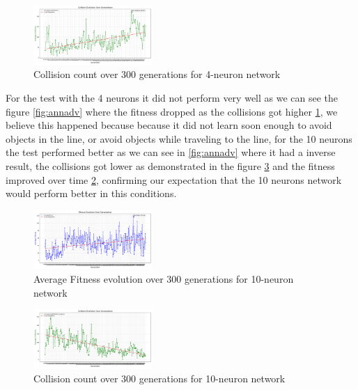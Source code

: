 \documentclass[final,5p,times,twocolumn,authoryear]{elsarticle}
\begin{document}
\begin{figure}[H]
    \centering
    \includegraphics[width=0.4\textwidth]{figures/fitness_ann_adv_plot_4n_collisions.png}
    \caption{Collision count over 300 generations for 4-neuron network}
    \label{fig:annadv2}
\end{figure}

For the test with the 4 neurons it did not perform very well as we can see the figure \ref{fig:annadv} where the fitness dropped as the collisions got higher \ref{fig:annadv2}, we believe this happened because because it did not learn soon enough to avoid objects in the line, or avoid objects while traveling to the line, for the 10 neurons the test performed better as we can see in \ref{fig:annadv} where it had a inverse result, the collisions got lower as demonstrated in the figure \ref{fig:annadv4} and the fitness improved over time \ref{fig:annadv3}, confirming our expectation that the 10 neurons network would perform better in this conditions.

\begin{figure}[H]
    \centering
    \includegraphics[width=0.4\textwidth]{figures/fitness_ann_adv_plot_10n.png}
    \caption{Average Fitness evolution over 300 generations for 10-neuron network}
    \label{fig:annadv3}
\end{figure}

\begin{figure}[H]
    \centering
    \includegraphics[width=0.4\textwidth]{figures/fitness_ann_adv_plot_10n_collisions.png}
    \caption{Collision count over 300 generations for 10-neuron network}
    \label{fig:annadv4}
\end{figure}
\end{document}
